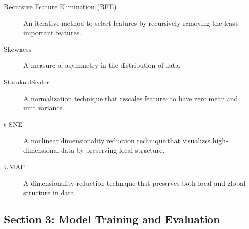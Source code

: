 \documentclass[11pt]{article}
\begin{document}
\begin{description}
\item[{Recursive Feature Elimination (RFE)}] An iterative method to select features by recursively removing the least important features.
\item[{Skewness}] A measure of asymmetry in the distribution of data.
\item[{StandardScaler}] A normalization technique that rescales features to have zero mean and unit variance.
\item[{t-SNE}] A nonlinear dimensionality reduction technique that visualizes high-dimensional data by preserving local structure.
\item[{UMAP}] A dimensionality reduction technique that preserves both local and global structure in data.
\end{description}

\subsection{Section 3: Model Training and Evaluation}
\label{sec:orgbf9472e}
\end{document}

